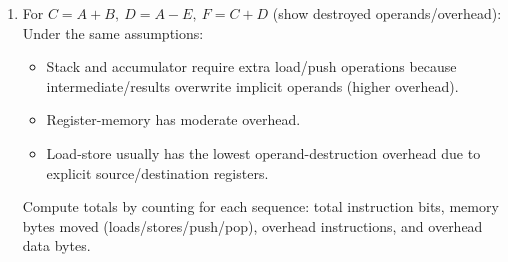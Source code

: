\documentclass[11pt]{article}
\begin{document}
\begin{enumerate}
\begin{enumerate}[label=(\alph*)]
\item For $C=A+B,\ D=A-E,\ F=C+D$ (show destroyed operands/overhead):\\
Under the same assumptions:
\begin{itemize}
\item Stack and accumulator require extra load/push operations because intermediate/results overwrite implicit operands (higher overhead).
\item Register-memory has moderate overhead.
\item Load-store usually has the lowest operand-destruction overhead due to explicit source/destination registers.
\end{itemize}
Compute totals by counting for each sequence: total instruction bits, memory bytes moved (loads/stores/push/pop), overhead instructions, and overhead data bytes.
\end{enumerate}
\end{enumerate}
\end{document}
